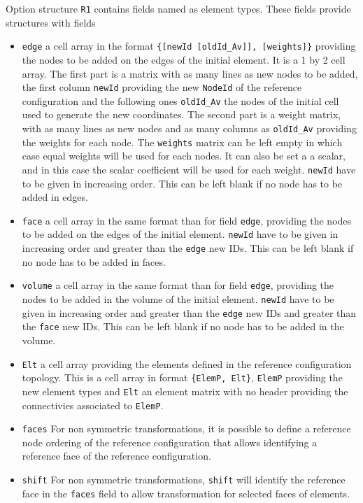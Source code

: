 \begin{itemize}
Option structure {\tt R1} contains fields named as element types. These fields provide structures with fields
\begin{itemize}
\item {\tt edge} a cell array in the format {\tt \{[newId [oldId\_Av]], [weights]\}} providing the nodes to be added on the edges of the initial element. It is a 1 by 2 cell array. The first part is a matrix with as many lines as new nodes to be added, the first column {\tt newId} providing the new {\tt NodeId} of the reference configuration and the following ones {\tt oldId\_Av} the nodes of the initial cell used to generate the new coordinates. The second part is a weight matrix, with as many lines as new nodes and as many columns as {\tt oldId\_Av} providing the weights for each node. The {\tt weights} matrix can be left empty in which case equal weights will be used for each nodes. It can also be set a a scalar, and in this case the scalar coefficient will be used for each weight. {\tt newId} have to be given in increasing order.  This can be left blank if no node has to be added in edges.
\item {\tt face} a cell array in the same format than for field {\tt edge}, providing the nodes to be added on the edges of the initial element. {\tt newId} have to be given in increasing order and greater than the {\tt edge} new IDs. This can be left blank if no node has to be added in faces.
\item {\tt volume} a cell array in the same format than for field {\tt edge}, providing the nodes to be added in the volume of the initial element. {\tt newId} have to be given in increasing order and greater than the {\tt edge} new IDs and greater than the {\tt face} new IDs. This can be left blank if no node has to be added in the volume.
\item {\tt Elt} a cell array providing the elements defined in the reference configuration topology. This is a cell array in format {\tt \{ElemP, Elt\}}, {\tt ElemP} providing the new element types and {\tt Elt} an element matrix with no header providing the connectivies associated to {\tt ElemP}.
\item {\tt faces} For non symmetric transformations, it is possible to define a reference node ordering of the reference configuration that allows identifying a reference face of the reference configuration.
\item {\tt shift} For non symmetric transformations, {\tt shift} will identify the reference face in the {\tt faces} field to allow transformation for selected faces of elements.
\end{itemize}


\end{itemize}
